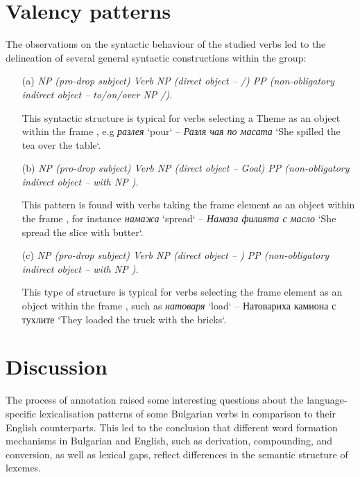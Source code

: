 \documentclass[output=paper,colorlinks,citecolor=brown]{langscibook}
\begin{document}
\section{Valency patterns} \label{ch5:sec:5}
The observations on the syntactic behaviour of the studied verbs led to the delineation of several general syntactic constructions within the group:
\begin{itemize}
\item[(a)] \textit{NP (pro-drop subject) Verb NP (direct object -- /) PP (non-obliga\-tory indirect object -- to/on/over NP /)}. 

This syntactic structure is typical for verbs selecting a Theme as an object within the frame , e.g \textit{разлея} `pour` -- \textit{Разля чая по масата} `She spilled the tea over the table`. 

\item[(b)] \textit{NP (pro-drop subject) Verb NP (direct object -- Goal) PP (non-obligatory indirect object -- with NP ).} 

This pattern is found with verbs taking the frame element  as an object within the frame , for instance \textit{ намажа} `spread` -- \textit{Намаза филията с масло} `She spread the slice with butter`.

\item[(c)] \textit{NP (pro-drop subject) Verb NP (direct object -- ) PP (non-obligato\-ry indirect object -- with NP ).} 

This type of structure is typical for verbs selecting the frame element  as an object within the frame , such as \textit{натоваря} `load` -- Нато\-вариха камиона с тухлите `They loaded the truck with the bricks`. 
\end{itemize}

\section{Discussion} \label{ch5:sec:6}
The process of annotation raised some interesting questions about the lan\-guage-specific lexicalisation patterns of some Bulgarian verbs in comparison to their English counterparts. This led to the conclusion that different word formation mechanisms in Bulgarian and English, such as derivation, compounding, and conversion, as well as lexical gaps, reflect differences in the semantic structure of lexemes. 
\end{document}
